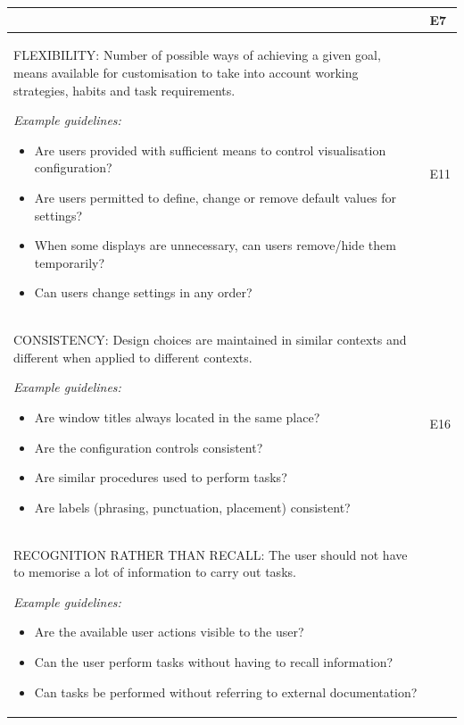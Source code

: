 \begin{longtable}{|p{12cm}|p{1cm}|}
& E7 \\ \hline
FLEXIBILITY: Number of possible ways of achieving a given goal, means available for customisation to take into account working strategies, habits and task requirements. 
\par
\textit{Example guidelines:}
\begin{itemize}
\item Are users provided with sufficient means to control visualisation configuration?
\item Are users permitted to define, change or remove default values for settings?
\item When some displays are unnecessary, can users remove/hide them temporarily?
\item Can users change settings in any order?
\end{itemize}

& E11 \\ \hline
CONSISTENCY: Design choices are maintained in similar contexts and different when applied to different contexts.
\par
\textit{Example guidelines:}
\begin{itemize}
\item Are window titles always located in the same place?
\item Are the configuration controls consistent?
\item Are similar procedures used to perform tasks?
\item Are labels (phrasing, punctuation, placement) consistent?
\end{itemize}

& E16 \\ \hline
RECOGNITION RATHER THAN RECALL: The user should not have to memorise a lot of information to carry out tasks.
\par
\textit{Example guidelines:}
\begin{itemize}
\item Are the available user actions visible to the user?
\item Can the user perform tasks without having to recall information?
\item Can tasks be performed without referring to external documentation?
\end{itemize}


\end{longtable}
